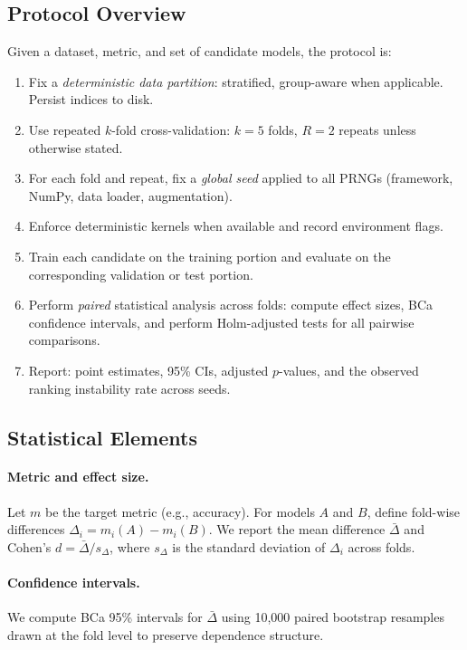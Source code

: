\documentclass[11pt]{article}
\begin{document}
\subsection{Protocol Overview}
Given a dataset, metric, and set of candidate models, the protocol is:
\begin{enumerate}
  \item Fix a \emph{deterministic data partition}: stratified, group-aware when applicable. Persist indices to disk.
  \item Use repeated $k$-fold cross-validation: $k=5$ folds, $R=2$ repeats unless otherwise stated.
  \item For each fold and repeat, fix a \emph{global seed} applied to all PRNGs (framework, NumPy, data loader, augmentation).
  \item Enforce deterministic kernels when available and record environment flags.
  \item Train each candidate on the training portion and evaluate on the corresponding validation or test portion.
  \item Perform \emph{paired} statistical analysis across folds: compute effect sizes, BCa confidence intervals, and perform Holm-adjusted tests for all pairwise comparisons.
  \item Report: point estimates, 95\% CIs, adjusted $p$-values, and the observed ranking instability rate across seeds.
\end{enumerate}

\subsection{Statistical Elements}
\paragraph{Metric and effect size.} Let \(m\) be the target metric (e.g., accuracy). For models $A$ and $B$, define fold-wise differences $\Delta_i = m_i(A) - m_i(B)$. We report the mean difference $\bar{\Delta}$ and Cohen's $d = \bar{\Delta} / s_\Delta$, where $s_\Delta$ is the standard deviation of $\Delta_i$ across folds.

\paragraph{Confidence intervals.} We compute BCa 95\% intervals for $\bar{\Delta}$ using 10,000 paired bootstrap resamples drawn at the fold level to preserve dependence structure.
\end{document}
